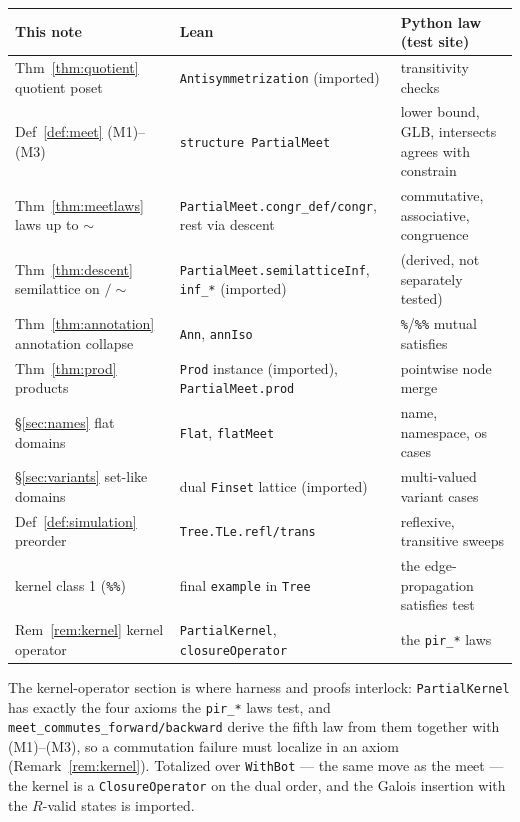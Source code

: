 \documentclass[11pt]{article}
\theoremstyle{definition}
\theoremstyle{remark}
\renewcommand{\ker}{\sim}
\newcommand{\code}[1]{\texttt{#1}}
\begin{document}
\begin{center}
\small
\begin{tabular}{@{}llp{4.1cm}@{}}
\toprule
This note & Lean & Python law (test site) \\
\midrule
Thm~\ref{thm:quotient} quotient poset & \code{Antisymmetrization} (imported) & transitivity checks \\
Def~\ref{def:meet} (M1)--(M3) & \code{structure PartialMeet} & lower bound, GLB, intersects agrees with constrain \\
Thm~\ref{thm:meetlaws} laws up to $\ker$ & \code{PartialMeet.congr\_def/congr}, rest via descent & commutative, associative, congruence \\
Thm~\ref{thm:descent} semilattice on $/\!\ker$ & \code{PartialMeet.semilatticeInf}, \code{inf\_*} (imported) & (derived, not separately tested) \\
Thm~\ref{thm:annotation} annotation collapse & \code{Ann}, \code{annIso} & \code{\%}/\code{\%\%} mutual satisfies \\
Thm~\ref{thm:prod} products & \code{Prod} instance (imported), \code{PartialMeet.prod} & pointwise node merge \\
\S\ref{sec:names} flat domains & \code{Flat}, \code{flatMeet} & name, namespace, os cases \\
\S\ref{sec:variants} set-like domains & dual \code{Finset} lattice (imported) & multi-valued variant cases \\
Def~\ref{def:simulation} preorder & \code{Tree.TLe.refl/trans} & reflexive, transitive sweeps \\
kernel class 1 (\code{\%\%}) & final \code{example} in \code{Tree} & the edge-propagation satisfies test \\
Rem~\ref{rem:kernel} kernel operator & \code{PartialKernel}, \code{closureOperator} & the \code{pir\_*} laws \\
\bottomrule
\end{tabular}
\end{center}

The kernel-operator section is where harness and proofs interlock:
\code{PartialKernel} has exactly the four axioms the \code{pir\_*} laws
test, and \code{meet\_commutes\_forward/backward} derive the fifth law
from them together with (M1)--(M3), so a commutation failure must localize
in an axiom (Remark~\ref{rem:kernel}).  Totalized over \code{WithBot} ---
the same move as the meet --- the kernel is a \code{ClosureOperator} on
the dual order, and the Galois insertion with the $R$-valid states is
imported.
\end{document}

